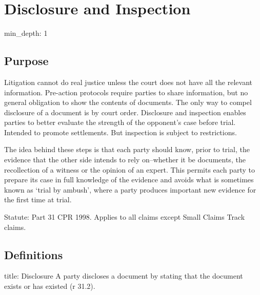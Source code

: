 \documentclass[
]{article}
\author{}
\date{}
\newenvironment{Shaded}{}{}
\newcommand{\NormalTok}[1]{#1}
\begin{document}
{
\setcounter{tocdepth}{3}
\tableofcontents
}
\hypertarget{disclosure-and-inspection}{%
\section{Disclosure and Inspection}\label{disclosure-and-inspection}}

\begin{Shaded}
\begin{Highlighting}[]
\NormalTok{min\_depth: 1}
\end{Highlighting}
\end{Shaded}

\hypertarget{purpose}{%
\subsection{Purpose}\label{purpose}}

Litigation cannot do real justice unless the court does not have all the
relevant information. Pre-action protocols require parties to share
information, but no general obligation to show the contents of
documents. The only way to compel disclosure of a document is by court
order. Disclosure and inspection enables parties to better evaluate the
strength of the opponent's case before trial. Intended to promote
settlements. But inspection is subject to restrictions.

The idea behind these steps is that each party should know, prior to
trial, the evidence that the other side intends to rely on--whether it
be documents, the recollection of a witness or the opinion of an expert.
This permits each party to prepare its case in full knowledge of the
evidence and avoids what is sometimes known as `trial by ambush', where
a party produces important new evidence for the first time at trial.

Statute: Part 31 CPR 1998. Applies to all claims except Small Claims
Track claims.

\hypertarget{definitions}{%
\subsection{Definitions}\label{definitions}}

\begin{Shaded}
\begin{Highlighting}[]
\NormalTok{title: Disclosure}
\NormalTok{A party discloses a document by stating that the document exists or has existed (r 31.2).}
\end{Highlighting}
\end{Shaded}
\end{document}
